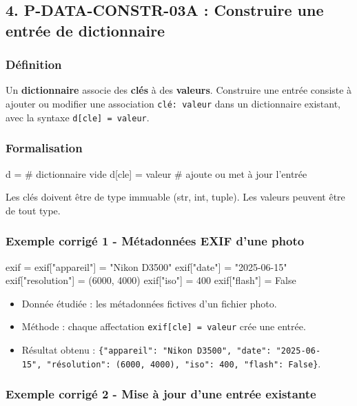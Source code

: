 \subsection{4. P-DATA-CONSTR-03A : Construire une entrée de dictionnaire}

\subsubsection{Définition}

Un \textbf{dictionnaire} associe des \textbf{clés} à des
\textbf{valeurs}. Construire une entrée consiste à ajouter ou modifier
une association \texttt{clé:\ valeur} dans un dictionnaire existant,
avec la syntaxe \texttt{d{[}cle{]}\ =\ valeur}.

\subsubsection{Formalisation}

\begin{python}
d = {}              # dictionnaire vide
d[cle] = valeur     # ajoute ou met à jour l'entrée
\end{python}

Les clés doivent être de type immuable (str, int, tuple). Les valeurs
peuvent être de tout type.

\subsubsection{Exemple corrigé 1 - Métadonnées EXIF d’une photo}

\begin{python}
exif = {}
exif["appareil"] = "Nikon D3500"
exif["date"] = "2025-06-15"
exif["resolution"] = (6000, 4000)
exif["iso"] = 400
exif["flash"] = False
\end{python}

\begin{itemize}
\tightlist
\item
  Donnée étudiée : les métadonnées fictives d'un fichier photo.
\item
  Méthode : chaque affectation \texttt{exif{[}cle{]}\ =\ valeur} crée
  une entrée.
\item
  Résultat obtenu :
  \texttt{\{"appareil":\ "Nikon\ D3500",\ "date":\ "2025-06-15",\ "résolution":\ (6000,\ 4000),\ "iso":\ 400,\ "flash":\ False\}}.
\end{itemize}

\subsubsection{Exemple corrigé 2 - Mise à jour d’une entrée existante}

